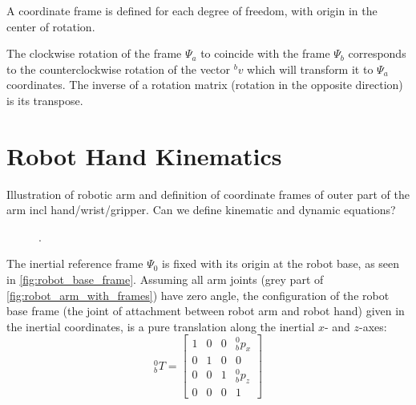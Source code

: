 A coordinate frame is defined for each degree of freedom, with origin in the center of rotation. 








The clockwise rotation of the frame $\Psi_a$ to coincide with the frame $\Psi_b$ corresponds to the counterclockwise rotation of the vector $^bv$ which will transform it to $\Psi_a$ coordinates. The inverse of a rotation matrix (rotation in the opposite direction) is its transpose.


\section{Robot Hand Kinematics}
Illustration of robotic arm and definition of coordinate frames of outer part of the arm incl hand/wrist/gripper. Can we define kinematic and dynamic equations?

\begin{figure}[htbp]
	\hspace{-15mm}
	\vspace{1mm}
	\hspace{10mm}
	\caption{.}
	\label{fig:robot_frames}
\end{figure}

The inertial reference frame $\Psi_0$ is fixed with its origin at the robot base, as seen in \autoref{fig:robot_base_frame}. Assuming all arm joints (grey part of \autoref{fig:robot_arm_with_frames}) have zero angle, the configuration of the robot base frame (the joint of attachment between robot arm and robot hand) given in the inertial coordinates, is a pure translation along the inertial $x$- and $z$-axes:
\begin{equation}
^0_b T = \begin{bmatrix}
1 & 0 & 0 & ^0_bp_x\\
0 & 1 & 0 & 0\\
0 & 0 & 1 & ^0_bp_z\\
0 & 0 & 0 & 1
\end{bmatrix}
\end{equation}


